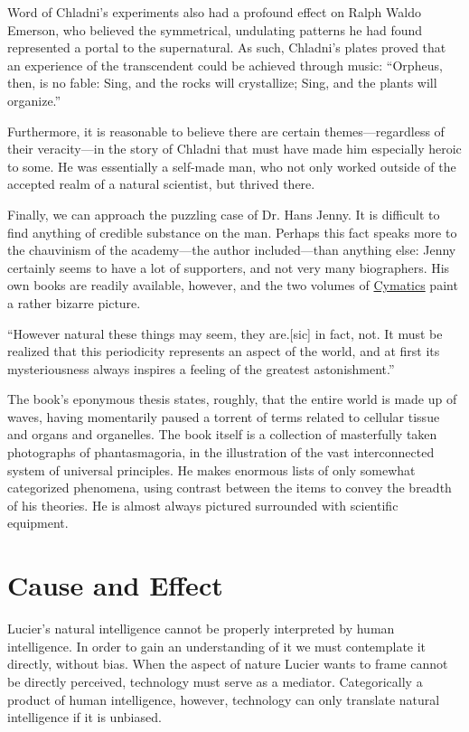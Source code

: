 \documentclass[a4paper,10pt]{report}
\numberwithin{equation}{section}
\begin{document}
Word of Chladni's experiments also had a profound effect on Ralph Waldo Emerson, who believed the symmetrical, undulating patterns he had found represented a portal to the supernatural. As such, Chladni's plates proved that an experience of the transcendent could be achieved through music: ``Orpheus, then, is no fable: Sing, and the rocks will crystallize; Sing, and the plants will organize.''\cite[p.~15]{Bonds2012}

Furthermore, it is reasonable to believe there are certain themes---regardless of their veracity---in the story of Chladni that must have made him especially heroic to some. He was essentially a self-made man, who not only worked outside of the accepted realm of a natural scientist, but thrived there. 

Finally, we can approach the puzzling case of Dr. Hans Jenny. It is difficult to find anything of credible substance on the man. Perhaps this fact speaks more to the chauvinism of the academy---the author included---than anything else: Jenny certainly seems to have a lot of supporters, and not very many biographers. His own books are readily available, however, and the two volumes of \underline{Cymatics} paint a rather bizarre picture.

``However natural these things may seem, they are.[sic] in fact,
 not. It must be realized that this periodicity represents an aspect of the world, and at first its mysteriousness always inspires a feeling of the greatest astonishment.'' \cite[p.~16]{Jenny2001}

The book's eponymous thesis states, roughly, that the entire world is made up of waves, having momentarily paused a torrent of terms related to cellular tissue and organs and organelles. The book itself is a collection of masterfully taken photographs of phantasmagoria, in the illustration of the vast interconnected system of universal principles. He makes enormous lists of only somewhat categorized phenomena, using contrast between the items to convey the breadth of his theories. He is almost always pictured surrounded with scientific equipment. 

\section{Cause and Effect}
 Lucier's natural intelligence cannot be properly interpreted by human intelligence. In order to gain an understanding of it we must contemplate it directly, without bias. When the aspect of nature Lucier wants to frame cannot be directly perceived, technology must serve as a mediator. Categorically a product of human intelligence, however, technology can only translate natural intelligence if it is unbiased. 
\end{document}
